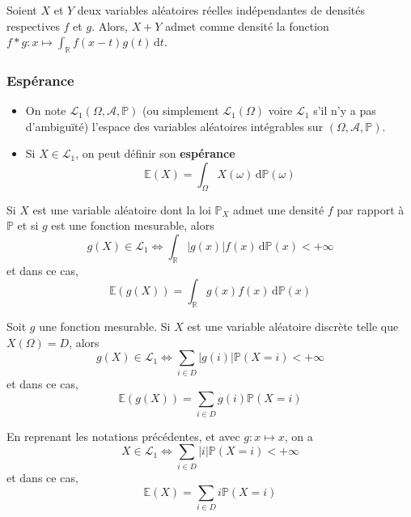 
  \begin{theorem}
    Soient $X$ et $Y$ deux variables aléatoires réelles indépendantes de densités respectives $f$ et $g$. Alors, $X + Y$ admet comme densité la fonction $f * g : x \mapsto \int_{\mathbb{R}} f(x-t) g(t) \, \mathrm{d}t$.
  \end{theorem}

  \subsubsection{Espérance}


  \begin{definition}
    \begin{itemize}
      \item On note $\mathcal{L}_1(\Omega, \mathcal{A}, \mathbb{P})$ (ou simplement $\mathcal{L}_1(\Omega)$ voire $\mathcal{L}_1$ s'il n'y a pas d'ambiguïté) l'espace des variables aléatoires intégrables sur $(\Omega, \mathcal{A}, \mathbb{P})$.
      \item Si $X \in \mathcal{L}_1$, on peut définir son \textbf{espérance}
      \[ \mathbb{E}(X) = \int_\Omega X(\omega) \, \mathrm{d}\mathbb{P}(\omega) \]
    \end{itemize}
  \end{definition}


  \begin{theorem}[Transfert]
    Si $X$ est une variable aléatoire dont la loi $\mathbb{P}_X$ admet une densité $f$ par rapport à $\mathbb{P}$ et si $g$ est une fonction mesurable, alors
    \[ g(X) \in \mathcal{L}_1 \iff \int_{\mathbb{R}} \vert g(x) \vert f(x) \, \mathrm{d}\mathbb{P}(x) < +\infty \]
    et dans ce cas,
    \[ \mathbb{E}(g(X)) = \int_{\mathbb{R}} g(x) f(x) \, \mathrm{d}\mathbb{P}(x) \]
  \end{theorem}

  \begin{corollary}
    Soit $g$ une fonction mesurable. Si $X$ est une variable aléatoire discrète telle que $X(\Omega) = D$, alors
    \[ g(X) \in \mathcal{L}_1 \iff \sum_{i \in D} \vert g(i) \vert \mathbb{P}(X = i) < +\infty \]
    et dans ce cas,
    \[ \mathbb{E}(g(X)) = \sum_{i \in D} g(i) \mathbb{P}(X = i) \]
  \end{corollary}

  \begin{remark}
    En reprenant les notations précédentes, et avec $g : x \mapsto x$, on a
    \[ X \in \mathcal{L}_1 \iff \sum_{i \in D} \vert i \vert \mathbb{P}(X = i) < +\infty \]
    et dans ce cas,
    \[ \mathbb{E}(X) = \sum_{i \in D} i \mathbb{P}(X = i) \]
  \end{remark}

